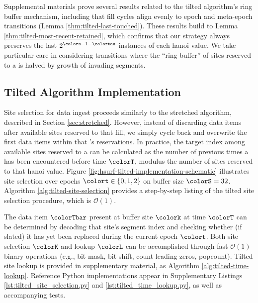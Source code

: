 Supplemental materials prove several results related to the tilted algorithm's ring buffer mechanism, including that fill cycles align evenly to epoch and meta-epoch transitions (Lemma \ref{thm:tilted-last-touched}).
These results build to Lemma \ref{thm:tilted-most-recent-retained}, which confirms that our strategy always preserves the last $2^{\colors - 1 - \colortau}$ instances of each hanoi value.
We take particular care in considering transitions where the ``ring buffer'' of sites reserved to a \hv{} is halved by growth of invading segments.

\subsection{Tilted Algorithm Implementation}
\label{sec:tilted-implementation}



Site selection for data ingest proceeds similarly to the stretched algorithm, described in Section \ref{sec:stretched}.
However, instead of discarding data items after available sites reserved to that \hv{} fill, we simply cycle back and overwrite the first data items within that \hv{}'s reservations.
In practice, the target index among available sites reserved to a \hv{} can be calculated as the number of previous times a \hv{} has been encountered before time $\colorT$, modulus the number of sites reserved to that hanoi value.
Figure \ref{fig:hsurf-tilted-implementation-schematic} illustrates site selection over epochs $\colort \in \{0,1,2\}$ on buffer size $\colorS=32$.
Algorithm \ref{alg:tilted-site-selection} provides a step-by-step listing of the tilted site selection procedure, which is $\mathcal{O}(1)$.



The data item $\colorTbar$ present at buffer site $\colork$ at time $\colorT$ can be determined by decoding that site's segment index and checking whether (if slated) it has yet been replaced during the current epoch $\colort$.
Both site selection $\colorK$ and lookup $\colorL$ can be accomplished through fast $\mathcal{O}(1)$ binary operations (e.g., bit mask, bit shift, count leading zeros, popcount).
Tilted site lookup is provided in supplementary material, as Algorithm \ref{alg:tilted-time-lookup}.
Reference Python implementations appear in Supplementary Listings \ref{lst:tilted_site_selection.py} and \ref{lst:tilted_time_lookup.py}, as well as accompanying tests.

